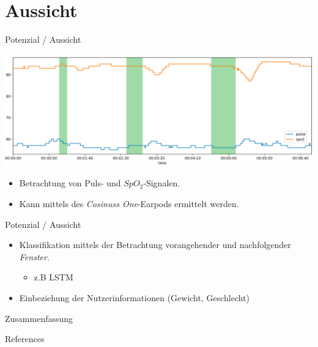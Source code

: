 \documentclass[18pt]{beamer}
\begin{document}
\section{Aussicht}
\begin{frame}{Potenzial / Aussicht}
    \begin{center}
        \includegraphics[scale=0.25]{images/futureWork/pulseSpo2_edited.png}
    \end{center}
    \begin{itemize}
        \item Betrachtung von Puls- und $SpO_2$-Signalen.
        \item Kann mittels des \textit{Cosinuss One}-Earpods ermittelt werden.
    \end{itemize}
\end{frame}

\begin{frame} {Potenzial / Aussicht}
    \begin{itemize}
        \item Klassifikation mittels der Betrachtung vorangehender und nachfolgender \textit{Fenster}.
        \begin{itemize}
            \item z.B LSTM
        \end{itemize}
        \item Einbeziehung der Nutzerinformationen (Gewicht, Geschlecht)
    \end{itemize}
\end{frame}

\begin{frame} {Zusammenfassung}    
    \tableofcontents
\end{frame}

\appendix

\begin{frame}[allowframebreaks]{References}
\printbibliography
\end{frame}

\end{document}
